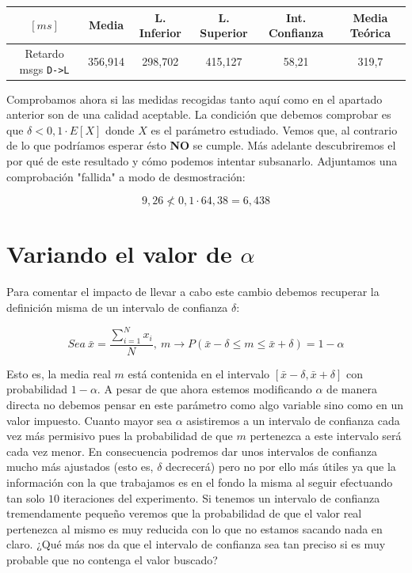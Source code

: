 \documentclass{article}[10pt]
\begin{document}
		\vskip 3mm

		\begin{center}
			\begin{tabular}{| c | c | c | c | c | c |}
				\hline
				$[ms]$ & Media & L. Inferior & L. Superior & Int. Confianza & Media Teórica\\
				\hline
				Retardo msgs \texttt{D->L} & 356,914 & 298,702 & 415,127 & 58,21 & 319,7\\
				\hline
			\end{tabular}
		\end{center}

		\vskip 3mm

		Comprobamos ahora si las medidas recogidas tanto aquí como en el apartado anterior son de una calidad aceptable. La condición que debemos comprobar es que $\delta < 0,1 \cdot E[X]$ donde $X$ es el parámetro estudiado. Vemos que, al contrario de lo que podríamos esperar ésto \textbf{NO} se cumple. Más adelante descubriremos el por qué de este resultado y cómo podemos intentar subsanarlo. Adjuntamos una comprobación "fallida" a modo de desmostración:

		$$9,26 \nless 0,1 \cdot 64,38 = 6,438$$

	\section{Variando el valor de $\alpha$}
		Para comentar el impacto de llevar a cabo este cambio debemos recuperar la definición misma de un intervalo de confianza $\delta$:

		$$Sea\ \bar{x} = \frac{\sum_{i = 1}^N x_i}{N}, \ m \rightarrow P(\bar{x} - \delta \leq m \leq \bar{x} + \delta) = 1 - \alpha$$

		Esto es, la media real $m$ está contenida en el intervalo $[\bar{x} - \delta, \bar{x} + \delta]$ con probabilidad $1 - \alpha$. A pesar de que ahora estemos modificando $\alpha$ de manera directa no debemos pensar en este parámetro como algo variable sino como en un valor impuesto. Cuanto mayor sea $\alpha$ asistiremos a un intervalo de confianza cada vez más permisivo pues la probabilidad de que $m$ pertenezca a este intervalo será cada vez menor. En consecuencia podremos dar unos intervalos de confianza mucho más ajustados (esto es, $\delta$ decrecerá) pero no por ello más útiles ya que la información con la que trabajamos es en el fondo la misma al seguir efectuando tan solo $10$ iteraciones del experimento. Si tenemos un intervalo de confianza tremendamente pequeño veremos que la probabilidad de que el valor real pertenezca al mismo es muy reducida con lo que no estamos sacando nada en claro. ¿Qué más nos da que el intervalo de confianza sea tan preciso si es muy probable que no contenga el valor buscado?
\end{document}
